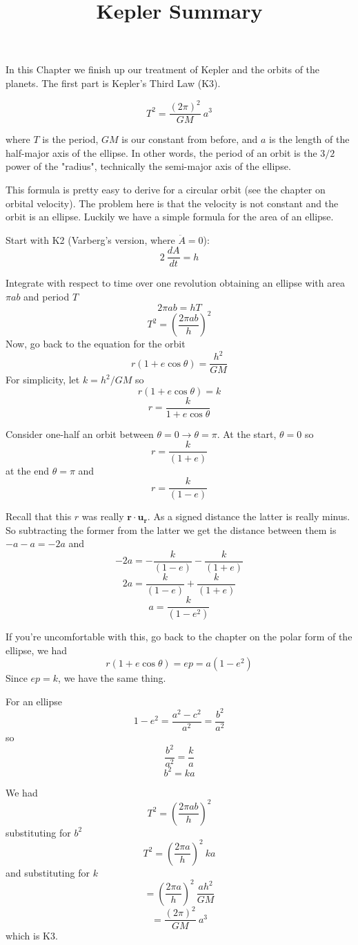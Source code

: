 \documentclass[11pt, oneside]{article}
\title{Kepler Summary}
\date{}
\begin{document}
\maketitle
\Large

In this Chapter we finish up our treatment of Kepler and the orbits of the planets.  The first part is Kepler's Third Law (K3).

\[ T^2 = \frac{(2 \pi)^2}{GM} \ a^3 \]

where $T$ is the period, $GM$ is our constant from before, and $a$ is the length of the half-major axis of the ellipse.  In other words, the period of an orbit is the $3/2$ power of the "radius", technically the semi-major axis of the ellipse.

This formula is pretty easy to derive for a circular orbit (see the chapter on orbital velocity).  The problem here is that the velocity is not constant and the orbit is an ellipse.  Luckily we have a simple formula for the area of an ellipse.

Start with K2 (Varberg's version, where $\ddot{A} = 0$):
\[ 2 \ \frac{dA}{dt} =  h \]

Integrate with respect to time over one revolution obtaining an ellipse with area $\pi a b$ and period $T$
\[ 2 \pi a b = hT \]
\[ T^2 = (\frac{2 \pi a b}{h})^2 \]
Now, go back to the equation for the orbit
\[ r(1 + e \cos \theta) = \frac{h^2}{GM} \]
For simplicity, let $k = h^2/GM$ so
\[ r(1 + e \cos \theta) = k  \]
\[ r = \frac{k}{1 + e \cos \theta}  \]

Consider one-half an orbit between $\theta = 0 \rightarrow \theta = \pi$.  At the start, $\theta = 0$ so
\[ r = \frac{k}{(1 + e)}  \]
at the end $\theta = \pi$ and
\[ r = \frac{k}{(1 - e)}  \]

Recall that this $r$ was really $\mathbf{r} \cdot \mathbf{u_r}$.  As a signed distance the latter is really minus.  So subtracting the former from the latter we get the distance between them is $-a -a = -2a$ and
\[ -2a = -  \frac{k}{(1 - e)} -  \frac{k}{(1 + e)} \]
\[ 2a = \frac{k}{(1 - e)} + \frac{k}{(1 + e)} \]
\[ a = \frac{k}{(1 - e^2)} \]

If you're uncomfortable with this, go back to the chapter on the polar form of the ellipse, we had 
\[ r(1 + e \cos \theta) = ep = a(1 - e^2) \]
Since $ep = k$, we have the same thing.

For an ellipse 
\[ 1 - e^2 = \frac{a^2 - c^2}{a^2} = \frac{b^2}{a^2} \]
so
\[ \frac{b^2}{a^2} = \frac{k}{a} \]
\[  b^2 = ka \]

We had 
\[ T^2 = (\frac{2 \pi a b}{h})^2 \]
substituting for $b^2$
\[ T^2 = (\frac{2 \pi a}{h})^2 \ ka \]
and substituting for $k$
\[ = (\frac{2 \pi a }{h})^2 \  \frac{ah^2}{GM}  \]
\[ = \frac{(2 \pi)^2}{GM} \ a^3 \]
which is K3.  
\end{document}
